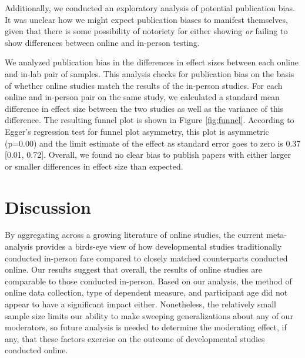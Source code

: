 \documentclass[
  man,floatsintext]{apa6}
\begin{document}
Additionally, we conducted an exploratory analysis of potential publication bias. It was unclear how we might expect publication biases to manifest themselves, given that there is some possibility of notoriety for either showing \emph{or} failing to show differences between online and in-person testing.

We analyzed publication bias in the differences in effect sizes between each online and in-lab pair of samples. This analysis checks for publication bias on the basis of whether online studies match the results of the in-person studies. For each online and in-person pair on the same study, we calculated a standard mean difference in effect size between the two studies as well as the variance of this difference. The resulting funnel plot is shown in Figure \ref{fig:funnel}. According to Egger's regression test for funnel plot asymmetry, this plot is asymmetric (p=0.00) and the limit estimate of the effect as standard error goes to zero is 0.37 {[}0.01, 0.72{]}. Overall, we found no clear bias to publish papers with either larger or smaller differences in effect size than expected.

\hypertarget{discussion}{%
\section{Discussion}\label{discussion}}

By aggregating across a growing literature of online studies, the current meta-analysis provides a birds-eye view of how developmental studies traditionally conducted in-person fare compared to closely matched counterparts conducted online. Our results suggest that overall, the results of online studies are comparable to those conducted in-person. Based on our analysis, the method of online data collection, type of dependent measure, and participant age did not appear to have a significant impact either. Nonetheless, the relatively small sample size limits our ability to make sweeping generalizations about any of our moderators, so future analysis is needed to determine the moderating effect, if any, that these factors exercise on the outcome of developmental studies conducted online.
\end{document}
